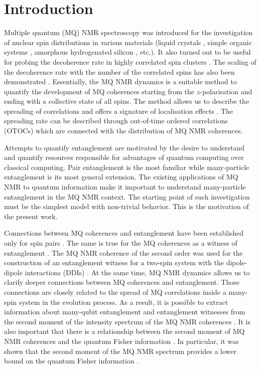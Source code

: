 \documentclass[
    pra,  
    twocolumn, 
    floatfix, 
    amsmath, 
    amssymb, 
    superscriptaddress
]{revtex4-1}
\begin{document}
\section{Introduction}
Multiple quantum (MQ) NMR spectroscopy \cite{mq_nmr_experiment} was introduced for the investigation of nuclear spin distributions in various materials (liquid crystals \cite{spin_distribution_in_liquid_system}, simple organic systems \cite{mq_nmr_experiment}, amorphous hydrogenated silicon \cite{spin_distribution_in_silicon}, etc.). 
It also turned out to be useful for probing the decoherence rate in highly correlated spin clusters \cite{decoherence_register,decoherence_ca_f2}. 
The scaling of the decoherence rate with the number of the correlated spins has also been demonstrated \cite{decoherence_register,lab:decoherence_2018}. 
Essentially, the MQ NMR dynamics is a suitable method to quantify the development of MQ coherences starting from the $z$-polarisation and ending with a collective state of all spins. 
The method allows us to describe the spreading of correlations \cite{mq_nmr_experiment,spin_distribution_in_liquid_system,decoherence_under_dq,nmr_dyn} and offers a signature of localisation effects \cite{loc_deloc_nmr_dyn,loc_in_chain}. The spreading rate can be described through out-of-time ordered correlations (OTOCs) which are connected with the distribution of MQ NMR coherences. 
\par
Attempts to quantify entanglement are motivated by the
desire to understand and quantify resources responsible for
advantages  of quantum computing over classical computing.
Pair entanglement is the most familiar while many-particle entanglement is its most general extension.
The existing applications of  MQ NMR to quantum information make it important to understand many-particle entanglement in the MQ NMR context.  
The starting point of such investigation must be the simplest model with non-trivial behavior. This is the motivation of the present work.
\par
Connections between MQ coherences and entanglement have been established only for spin pairs \cite{lab:entanglement_dyn_2003,entanglement_dyn,nuclear_polarization_and_entanglement}.  The same is true for the MQ coherences as a witness of entanglement \cite{sep_of_mixed_states}. The MQ NMR coherence of the second order was used for the construction of an entanglement witness for a two-spin system with the dipole-dipole interactions (DDIs) \cite{lab:entanglement_witness_nmr_2008,lab:mq_mnr_qinfo_2012}. At the same time, MQ NMR dynamics allows us to clarify deeper connections between MQ coherences and entanglement. Those connections are closely related to the spread of MQ correlations inside a many-spin system in the evolution process. As a result, it is possible to extract information about many-qubit entanglement and entanglement witnesses from the second moment of the intensity spectrum of the MQ NMR coherences \cite{otoc_to_enanglement_via_mqcoh}. It is also important that there is a relationship between the second moment of MQ NMR coherences and the quantum Fisher information \cite{qmetrology_for_qinfo,qmetrology_nonclassiscal_state}. In particular, it was shown that the second moment of the MQ NMR spectrum provides a lower bound on the quantum Fisher information \cite{otoc_to_enanglement_via_mqcoh}.
\end{document}
